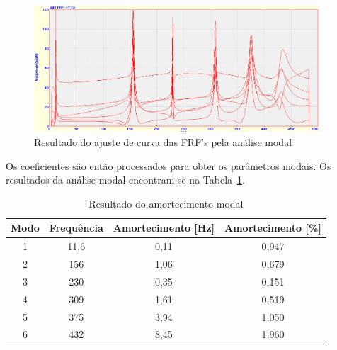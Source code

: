\begin{figure}[h]
	\centering 
 	\includegraphics[width=0.95\textwidth]{figs/curve_fitting}
 	\caption{Resultado do ajuste de curva das FRF's pela análise modal}
 	\label{fig::curve_fitting}
\end{figure}

Os coeficientes são então processados para obter os parâmetros modais. Os
resultados da análise modal encontram-se na
Tabela~\ref{tab::resultado_modal}.
%
\begin{table}[h]
\centering
\caption{Resultado do amortecimento modal}
\label{tab::resultado_modal}
\begin{tabular}{@{}cccc@{}}
\toprule
Modo & Frequência & Amortecimento {[}Hz{]} & Amortecimento {[}\%{]} \\ \hline
1    & 11,6       & 0,11                   & 0,947                  \\
2    & 156        & 1,06                   & 0,679                  \\
3    & 230        & 0,35                   & 0,151                  \\
4    & 309        & 1,61                   & 0,519                  \\
5    & 375        & 3,94                   & 1,050                  \\
6    & 432        & 8,45                   & 1,960                  \\ \hline
\end{tabular}
\end{table}
%

% 


